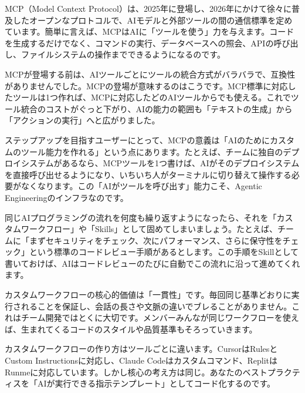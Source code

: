 


MCP（Model Context Protocol）は、2025年に登場し、2026年にかけて徐々に普及したオープンなプロトコルで、AIモデルと外部ツールの間の通信標準を定めています。簡単に言えば、MCPはAIに「ツールを使う」力を与えます。コードを生成するだけでなく、コマンドの実行、データベースへの照会、APIの呼び出し、ファイルシステムの操作までできるようになるのです。

MCPが登場する前は、AIツールごとにツールの統合方式がバラバラで、互換性がありませんでした。MCPの登場が意味するのはこうです。MCP標準に対応したツールは1つ作れば、MCPに対応したどのAIツールからでも使える。これでツール統合のコストがぐっと下がり、AIの能力の範囲も「テキストの生成」から「アクションの実行」へと広がりました。

ステップアップを目指すユーザーにとって、MCPの意義は「AIのためにカスタムのツール能力を作れる」という点にあります。たとえば、チームに独自のデプロイシステムがあるなら、MCPツールを1つ書けば、AIがそのデプロイシステムを直接呼び出せるようになり、いちいち人がターミナルに切り替えて操作する必要がなくなります。この「AIがツールを呼び出す」能力こそ、Agentic Engineeringのインフラなのです。


同じAIプログラミングの流れを何度も繰り返すようになったら、それを「カスタムワークフロー」や「Skills」として固めてしまいましょう。たとえば、チームに「まずセキュリティをチェック、次にパフォーマンス、さらに保守性をチェック」という標準のコードレビュー手順があるとします。この手順をSkillとして書いておけば、AIはコードレビューのたびに自動でこの流れに沿って進めてくれます。

カスタムワークフローの核心的価値は「一貫性」です。毎回同じ基準どおりに実行されることを保証し、会話の長さや文脈の違いでブレることがありません。これはチーム開発ではとくに大切です。メンバーみんなが同じワークフローを使えば、生まれてくるコードのスタイルや品質基準もそろっていきます。

カスタムワークフローの作り方はツールごとに違います。CursorはRulesとCustom Instructionsに対応し、Claude Codeはカスタムコマンド、ReplitはRunmeに対応しています。しかし核心の考え方は同じ。あなたのベストプラクティスを「AIが実行できる指示テンプレート」としてコード化するのです。


